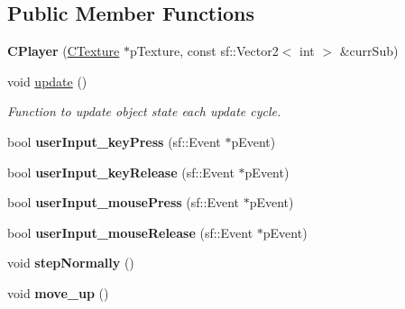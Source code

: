 \subsection*{Public Member Functions}
\begin{DoxyCompactItemize}
\item 
\hypertarget{classCPlayer_a983c63a3e18585a94f66f0bd23c57cd3}{{\bfseries C\-Player} (\hyperlink{classCTexture}{C\-Texture} $\ast$p\-Texture, const sf\-::\-Vector2$<$ int $>$ \&curr\-Sub)}\label{classCPlayer_a983c63a3e18585a94f66f0bd23c57cd3}

\item 
\hypertarget{classCPlayer_aa77025c046956b109a76d53c12a80fa5}{void \hyperlink{classCPlayer_aa77025c046956b109a76d53c12a80fa5}{update} ()}\label{classCPlayer_aa77025c046956b109a76d53c12a80fa5}

\begin{DoxyCompactList}\small\item\em Function to update object state each update cycle. \end{DoxyCompactList}\item 
\hypertarget{classCPlayer_ab91fc8d3c4e992dd20270d5743d75f06}{bool {\bfseries user\-Input\-\_\-key\-Press} (sf\-::\-Event $\ast$p\-Event)}\label{classCPlayer_ab91fc8d3c4e992dd20270d5743d75f06}

\item 
\hypertarget{classCPlayer_a8ef81a467d70f1e4529f3c905820311b}{bool {\bfseries user\-Input\-\_\-key\-Release} (sf\-::\-Event $\ast$p\-Event)}\label{classCPlayer_a8ef81a467d70f1e4529f3c905820311b}

\item 
\hypertarget{classCPlayer_ab73ca18309b25410b1fdb54a9ee60e67}{bool {\bfseries user\-Input\-\_\-mouse\-Press} (sf\-::\-Event $\ast$p\-Event)}\label{classCPlayer_ab73ca18309b25410b1fdb54a9ee60e67}

\item 
\hypertarget{classCPlayer_a915cf5ad902cddb376eb4c37d362e3b1}{bool {\bfseries user\-Input\-\_\-mouse\-Release} (sf\-::\-Event $\ast$p\-Event)}\label{classCPlayer_a915cf5ad902cddb376eb4c37d362e3b1}

\item 
\hypertarget{classCPlayer_aedadef185076d940923e9402a15cdf90}{void {\bfseries step\-Normally} ()}\label{classCPlayer_aedadef185076d940923e9402a15cdf90}

\item 
\hypertarget{classCPlayer_a66e70893b9da823210b40638a19d6406}{void {\bfseries move\-\_\-up} ()}\label{classCPlayer_a66e70893b9da823210b40638a19d6406}


\end{DoxyCompactItemize}
